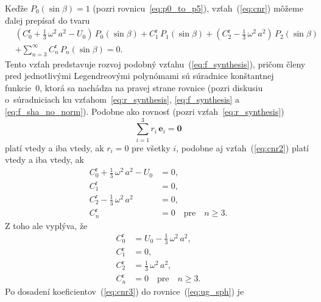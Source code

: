 \documentclass[a4paper,12pt]{book}
\let\vec\mathbf
\begin{document}
Keďže $P_0(\sin\beta) = 1$ (pozri rovnicu~\ref{eq:p0_to_p5}), 
vzťah~(\ref{eq:cnr}) môžeme ďalej prepísať do tvaru
%
\begin{equation}
\label{eq:cnr2}
\begin{split}
&\left( C_0^\mathrm{r} + \frac{1}{3} \, \omega^2 \, a^2 - U_0 \right) \, 
P_0(\sin\beta) + C_1^\mathrm{r} \, P_1(\sin\beta) + \left(C_2^\mathrm{r} 
- \frac{1}{3} \, \omega^2 \, a^2 \right) \, P_2(\sin\beta)\\
%
&+ \sum_{n = 3}^\infty C^{\mathrm{r}}_n \, P_n(\sin\beta) = 0{.}
\end{split}
\end{equation}
%
Tento vzťah predstavuje rozvoj podobný vzťahu~(\ref{eq:f_synthesis}), pričom 
členy pred jednotlivými Legendreovými polynómami sú súradnice konštantnej 
funkcie~0, ktorá sa nachádza na pravej strane rovnice (pozri diskusiu 
o~súradniciach ku vzťahom~\ref{eq:r_synthesis}, \ref{eq:f_synthesis} 
a \ref{eq:f_sha_no_norm}).  Podobne ako rovnosť (pozri 
vzťah~\ref{eq:r_synthesis})
%
\begin{equation}
\sum_{i = 1}^3 r_i \, \vec{e}_i = \vec{0}
\end{equation}
%
platí vtedy a iba vtedy, ak $r_i = 0$ pre všetky $i$, podobne aj 
vzťah~(\ref{eq:cnr2}) platí vtedy a iba vtedy, ak
%
\begin{equation}
\begin{split}
C_0^\mathrm{r} + \frac{1}{3} \, \omega^2 \, a^2 - U_0 &= 0{,}\\
C_1^\mathrm{r}                                        &= 0{,}\\
C_2^\mathrm{r} - \frac{1}{3} \, \omega^2 \, a^2       &= 0{,}\\
C_n^\mathrm{r}                                        &= 0 \quad \textrm{pre} 
\quad n \geq 3{.}
\end{split}
\end{equation}
%
Z toho ale vyplýva, že
%
\begin{equation}
\label{eq:cnr3}
\begin{split}
C_0^\mathrm{r} &= U_0 - \frac{1}{3} \, \omega^2 \, a^2{,}\\
C_1^\mathrm{r} &= 0{,}\\
C_2^\mathrm{r} &= \frac{1}{3} \, \omega^2 \, a^2{,}\\
C_n^\mathrm{r} &= 0 \quad \textrm{pre} \quad n \geq 3{.}
\end{split}
\end{equation}
%
Po dosadení koeficientov~(\ref{eq:cnr3}) do rovnice~(\ref{eq:ug_sph}) je 
\end{document}
